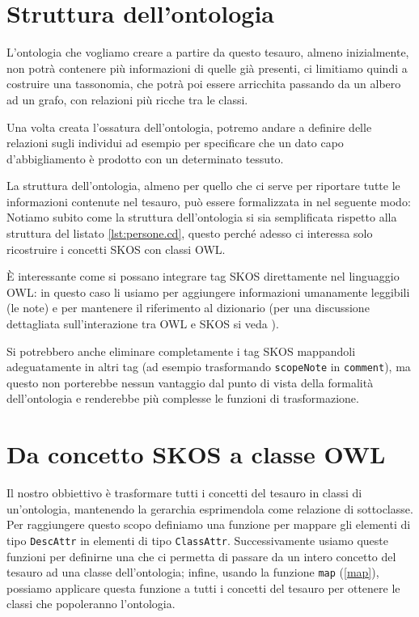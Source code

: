 \section{Struttura dell'ontologia}
L'ontologia che vogliamo creare a partire da questo tesauro, almeno inizialmente, non potrà contenere più informazioni di quelle già presenti, ci limitiamo quindi a costruire una tassonomia, che potrà poi essere arricchita passando da un albero ad un grafo, con relazioni più ricche tra le classi. 

Una volta creata l'ossatura dell'ontologia, potremo andare a definire delle relazioni sugli individui ad esempio per specificare che un dato capo d'abbigliamento è prodotto con un determinato tessuto.

La struttura dell'ontologia, almeno per quello che ci serve per riportare tutte le informazioni contenute nel tesauro, può essere formalizzata in \cduce nel seguente modo:
Notiamo subito come la struttura dell'ontologia si sia semplificata rispetto alla struttura del listato \ref{lst:persone.cd}, questo perché adesso ci interessa solo ricostruire i concetti SKOS con classi OWL.

È interessante come si possano integrare tag SKOS direttamente nel linguaggio OWL: in questo caso li usiamo per aggiungere informazioni umanamente leggibili (le note) e per mantenere il riferimento al dizionario (per una discussione dettagliata sull'interazione tra OWL e SKOS si veda \cite{OWL&SKOS}).

Si potrebbero anche eliminare completamente i tag SKOS mappandoli adeguatamente in altri tag (ad esempio trasformando \verb|scopeNote| in \verb|comment|), ma questo non porterebbe nessun vantaggio dal punto di vista della formalità dell'ontologia e renderebbe più complesse le funzioni di trasformazione.

\section{Da concetto SKOS a classe OWL}
Il nostro obbiettivo è trasformare tutti i concetti del tesauro in classi di un'ontologia, mantenendo la gerarchia esprimendola come relazione di sottoclasse. Per raggiungere questo scopo definiamo una funzione per mappare gli elementi di tipo \verb|DescAttr| in elementi di tipo \verb|ClassAttr|. Successivamente usiamo queste funzioni per definirne una che ci permetta di passare da un intero concetto del tesauro ad una classe dell'ontologia; infine, usando la funzione \verb|map| (\ref{map}), possiamo applicare questa funzione a tutti i concetti del tesauro per ottenere le classi che popoleranno l'ontologia.
